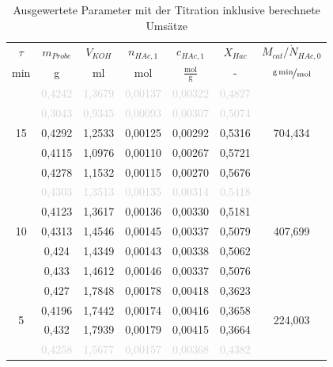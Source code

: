 \documentclass[12pt,liststotoc]{report}
\begin{document}
\begin{table}[htbp]
  \centering
  \caption[Ausgewertete Parameter mit der Titration]{Ausgewertete Parameter mit der Titration inklusive berechnete Umsätze}
    \begin{tabular}{ccccccc}
    \toprule
    $\tau$ & $m_{Probe}$ & $V_{KOH}$ & $n_{HAc, 1}$ & $c_{HAc, 1}$ & $X_{Hac}$ & $M_{cat}/\dot{N}_{HAc, 0}$ \\
    min   & g     & ml    & mol   & $\frac{\text{mol}}{\text{g}}$ & -     & $\nicefrac{\text{g}\,\text{min}}{\text{mol}}$ \\
    \midrule
    \multirow{5}[2]{*}{15} &   \textcolor{lightgray}{0,4242} & \textcolor{lightgray}{1,3679} & \textcolor{lightgray}{0,00137} & \textcolor{lightgray}{0,00322} & \textcolor{lightgray}{0,4827}   & \multirow{5}[2]{*}{704,434} \\
          & \textcolor{lightgray}{0,3043} & \textcolor{lightgray}{0,9345} & \textcolor{lightgray}{0,00093} & \textcolor{lightgray}{0,00307} & \textcolor{lightgray}{0,5074} &  \\
          & 0,4292 & 1,2533 & 0,00125 & 0,00292 & 0,5316 &  \\
          & 0,4115 & 1,0976 & 0,00110 & 0,00267 & 0,5721 &  \\
          & 0,4278 & 1,1532 & 0,00115 & 0,00270 & 0,5676 &  \\
    \midrule
    \multirow{5}[2]{*}{10} & \textcolor{lightgray}{0,4303} & \textcolor{lightgray}{1,3513} & \textcolor{lightgray}{0,00135} & \textcolor{lightgray}{0,00314} & \textcolor{lightgray}{0,5418} & \multirow{5}[2]{*}{407,699} \\
          & 0,4123 & 1,3617 & 0,00136 & 0,00330 & 0,5181 &  \\
          & 0,4313 & 1,4546 & 0,00145 & 0,00337 & 0,5079 &  \\
          & 0,424 & 1,4349 & 0,00143 & 0,00338 & 0,5062 &  \\
          & 0,433 & 1,4612 & 0,00146 & 0,00337 & 0,5076 &  \\
    \midrule
    \multirow{5}[2]{*}{5} & 0,427 & 1,7848 & 0,00178 & 0,00418 & 0,3623 & \multirow{5}[2]{*}{224,003} \\
          & 0,4196 & 1,7442 & 0,00174 & 0,00416 & 0,3658 &  \\
          & 0,432 & 1,7939 & 0,00179 & 0,00415 & 0,3664 &  \\
          & \textcolor{lightgray}{0,4258} & \textcolor{lightgray}{1,5677} & \textcolor{lightgray}{0,00157} & \textcolor{lightgray}{0,00368} & \textcolor{lightgray}{0,4382} &  \\

\end{tabular}
\end{table}
\end{document}

